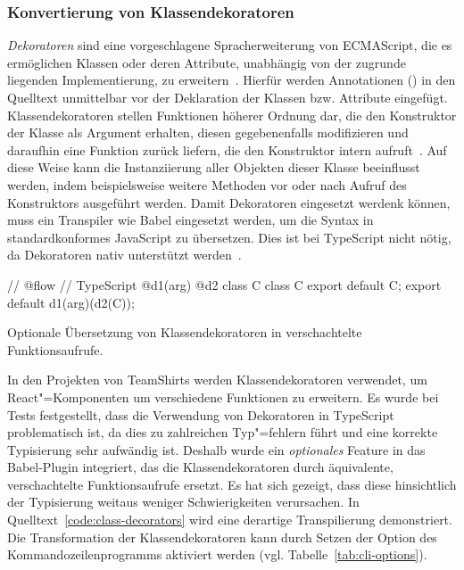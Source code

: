 \subsubsection{Konvertierung von Klassendekoratoren}
\label{subsec:class-decorators}

\textit{Dekoratoren} sind eine vorgeschlagene Spracherweiterung von ECMAScript, die es ermöglichen Klassen oder deren Attribute, unabhängig von der zugrunde liegenden Implementierung, zu erweitern~\autocite{ES_PROPOSAL:DECORATORS}. Hierfür werden Annotationen () in den Quelltext unmittelbar vor der Deklaration der Klassen bzw. Attribute eingefügt. Klassendekoratoren stellen Funktionen höherer Ordnung dar, die den Konstruktor der Klasse als Argument erhalten, diesen gegebenenfalls modifizieren und daraufhin eine Funktion zurück liefern, die den Konstruktor intern aufruft~\autocite{ES_PROPOSAL:DECORATORS}. Auf diese Weise kann die Instanziierung aller Objekten dieser Klasse beeinflusst werden, indem beispielsweise weitere Methoden vor oder nach Aufruf des Konstruktors ausgeführt werden. Damit Dekoratoren eingesetzt werdenk können, muss ein Transpiler wie Babel eingesetzt werden, um die Syntax in standardkonformes JavaScript zu übersetzen. Dies ist bei TypeScript nicht nötig, da Dekoratoren nativ unterstützt werden~\autocite{TYPESCRIPT_HANDBOOK:DECORATORS}.

\bigbreak
\begin{listing}[htb]
\begin{textcode}
// @flow                                        // TypeScript
@d1(arg)
@d2
class C {}                                      class C {}
export default C;                               export default d1(arg)(d2(C));
\end{textcode}
\listingvspace
\caption{Optionale Übersetzung von Klassendekoratoren in verschachtelte Funktionsaufrufe.}
\label{code:class-decorators}
\end{listing}

In den Projekten von TeamShirts werden Klassendekoratoren verwendet, um React"=Komponenten um verschiedene Funktionen zu erweitern. Es wurde bei Tests festgestellt, dass die Verwendung von Dekoratoren in TypeScript problematisch ist, da dies zu zahlreichen Typ"=fehlern führt und eine korrekte Typisierung sehr aufwändig ist. Deshalb wurde ein \emph{optionales} Feature in das Babel-Plugin integriert, das die Klassendekoratoren durch äquivalente, verschachtelte Funktionsaufrufe ersetzt. Es hat sich gezeigt, dass diese hinsichtlich der Typisierung weitaus weniger Schwierigkeiten verursachen. In Quelltext~\ref{code:class-decorators} wird eine derartige Transpilierung demonstriert. Die Transformation der Klassendekoratoren kann durch Setzen der Option  des Kommandozeilenprogramms aktiviert werden (vgl. Tabelle~\ref{tab:cli-options}).

